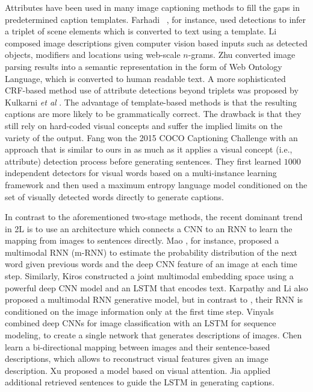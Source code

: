 Attributes have been used in many image captioning methods to fill the gaps in predetermined caption templates. Farhadi \etal~\cite{farhadi2010every}, for instance, used detections to infer a triplet of scene elements which is converted to text using a template. Li \etal \cite{li2011composing} composed image descriptions given computer vision based inputs such as detected objects, modifiers and locations using web-scale $n$-grams. Zhu \etal \cite{yao2010i2t} converted image parsing results into a semantic representation in the form of Web Ontology Language, which is converted to human readable text. A more sophisticated CRF-based method use of attribute detections beyond triplets was proposed by Kulkarni \textit{et al} \cite{kulkarni2013babytalk}. The advantage of template-based methods is that the resulting captions are more likely to be grammatically correct. The drawback is that they still rely on hard-coded visual concepts and suffer the implied limits on the variety of the output. %
Fang \etal \cite{fang2014captions} won the 2015 COCO Captioning Challenge with an approach that is similar to ours in as much as it applies a visual concept (i.e., attribute) detection process before generating sentences. They first learned $1000$ independent detectors for visual words based on a multi-instance learning framework and then used a maximum entropy language model conditioned on the set of visually detected words directly to generate captions. 
%
%
%

In contrast to the aforementioned two-stage methods, the recent dominant trend in \V2L is to use an architecture which connects a CNN to an RNN to learn the mapping from images to sentences directly. Mao \etal \cite{mao2014deep}, for instance, proposed a multimodal RNN (m-RNN) to estimate the probability distribution of the next word given previous words and the deep CNN feature of an image at each time step. Similarly, Kiros \etal \cite{kiros2014unifying} constructed a joint multimodal embedding space using a powerful deep CNN model and an LSTM that encodes text. Karpathy and Li \cite{Karpathy2014deepvs} also proposed a multimodal RNN generative model, but in contrast to \cite{mao2014deep}, their RNN is conditioned on the image information only at the first time step. Vinyals \etal \cite{vinyals2014show} combined deep CNNs for image classification with an LSTM for sequence modeling, to create a single network that generates descriptions of images. Chen \etal \cite{Chen2015CVPRMind} learn a bi-directional mapping between images and their sentence-based descriptions, which allows to reconstruct visual features given an image description. Xu \etal \cite{xu2015show} proposed a model based on visual attention. Jia \etal \cite{jia2015guilding} applied additional retrieved sentences to guide the LSTM in generating captions.

